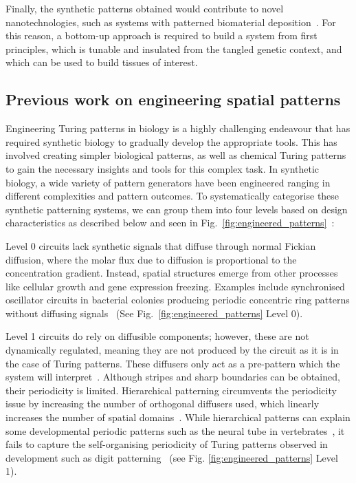 Finally, the synthetic patterns obtained would contribute to novel nanotechnologies, such as systems with patterned biomaterial deposition~\parencite{Din2020, Cao2017}.
For this reason, a bottom-up approach is required to build a system from first principles, which is tunable and insulated from the tangled genetic context, and which can be used to build tissues of interest.



\subsection{Previous work on engineering spatial patterns}

Engineering Turing patterns in biology is a highly challenging endeavour that has required synthetic biology to gradually develop the appropriate tools.
This has involved creating simpler biological patterns, as well as chemical Turing patterns to gain the necessary insights and tools for this complex task.
In synthetic biology, a wide variety of pattern generators have been engineered ranging in different complexities and pattern outcomes.
To systematically categorise these synthetic patterning systems, we can group them into four levels based on design characteristics as described below and seen in Fig.~\ref{fig:engineered_patterns}~\parencite{huidobro}:

Level 0 circuits lack synthetic signals that diffuse through normal Fickian diffusion, where the molar flux due to diffusion is proportional to the concentration gradient.
Instead, spatial structures emerge from other processes like cellular growth and gene expression freezing.
Examples include synchronised oscillator circuits in bacterial colonies producing periodic concentric ring patterns without diffusing signals~\parencite{Potvin-Trottier2016, Riglar2019} (See Fig.~\ref{fig:engineered_patterns} Level 0).

Level 1 circuits do rely on diffusible components; however, these are not dynamically regulated, meaning they are not produced by the circuit as it is in the case of Turing patterns.
These diffusers only act as a pre-pattern which the system will interpret~\parencite{Basu2005, Schaerli2014, Kong2017, Barbier2020, Grant2020}.
Although stripes and sharp boundaries can be obtained, their periodicity is limited.
Hierarchical patterning circumvents the periodicity issue by increasing the number of orthogonal diffusers used, which linearly increases the number of spatial domains~\parencite{Boehm2018}.
While hierarchical patterns can explain some developmental periodic patterns such as the neural tube in vertebrates~\parencite{Briscoe2015}, it fails to capture the self-organising periodicity of Turing patterns observed in development such as digit patterning~\parencite{Sheth2012,Raspopovic1} (see Fig. \ref{fig:engineered_patterns} Level 1).

